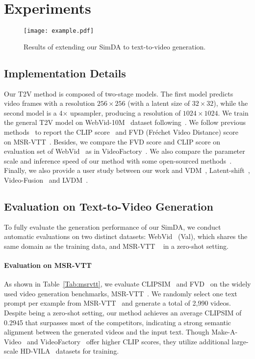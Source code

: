 \section{Experiments}

\begin{figure*}
    \centering
    \texttt{[image: example.pdf]}
    \caption{Results of extending our SimDA to text-to-video generation.}
    \label{fig:text2video}
\end{figure*}

\subsection{Implementation Details}
Our T2V method is composed of two-stage models. The first model predicts video frames with a resolution $256\times256$ (with a latent size of $32\times32$), while the second model is a 4$\times$ upsampler, producing a resolution of $1024\times1024$. 
We train the general T2V model on WebVid-10M~\cite{webvid} dataset following~\cite{videoLDM,latentshift}. We follow previous methods~\cite{videofactory, latentshift, magicvideo} to report the CLIP score~\cite{clip} and FVD (Fréchet Video Distance) score~\cite{fvd} on MSR-VTT~\cite{msrvtt}. Besides, we compare the FVD score and CLIP score on evaluation set of WebVid~\cite{webvid} as in VideoFactory~\cite{videofactory}. We also compare the parameter scale and inference speed of our method with some open-sourced methods~\cite{lvdm,videofusion, latentshift}. Finally, we also provide a user study between our work and VDM~\cite{vdm}, Latent-shift~\cite{latentshift}, Video-Fusion~\cite{videofusion} and LVDM~\cite{lvdm}. 

\subsection{Evaluation on Text-to-Video Generation}
To fully evaluate the generation performance of our SimDA, we conduct automatic evaluations on two distinct datasets: WebVid~\cite{webvid} (Val), which shares the same domain as the training data, and MSR-VTT ~\cite{msrvtt} in a zero-shot setting.

\paragraph{Evaluation on MSR-VTT}
As shown in Table~\ref{Tab:msrvtt}, we evaluate CLIPSIM~\cite{clip} and FVD~\cite{fvd} on the widely used video generation benchmarks, MSR-VTT~\cite{msrvtt}. We randomly select one text prompt per example from MSR-VTT~\cite{msrvtt} and generate a total of 2,990 videos. Despite being a zero-shot setting, our method achieves an average CLIPSIM of 0.2945 that surpasses most of the competitors, indicating a strong semantic alignment between the generated videos and the input text. 
Though Make-A-Video~\cite{singer2022make} and VideoFactory~\cite{videofactory} offer higher CLIP scores, they utilize additional large-scale HD-VILA~\cite{hd-vila} datasets for training.

